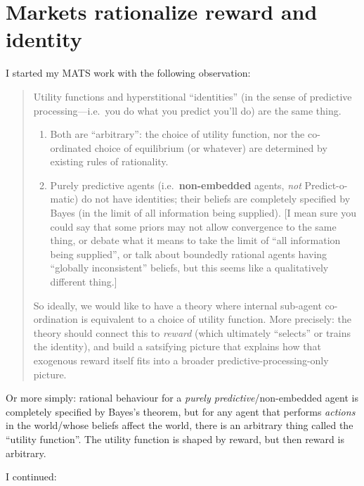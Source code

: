 \hypertarget{markets-rationalize-reward-and-identity}{%
\section{Markets rationalize reward and identity}\label{markets-rationalize-reward-and-identity}}

I started my MATS work with the following observation:

\begin{quote}
Utility functions and hyperstitional ``identities'' (in the sense of predictive processing---i.e.~you do what you predict you'll do) are the same thing.

\begin{enumerate}
\def\labelenumi{\arabic{enumi}.}
\tightlist
\item
  Both are ``arbitrary'': the choice of utility function, nor the co-ordinated choice of equilibrium (or whatever) are determined by existing rules of rationality.
\item
  Purely predictive agents (i.e.~\textbf{non-embedded} agents, \emph{not} Predict-o-matic) do not have identities; their beliefs are completely specified by Bayes (in the limit of all information being supplied). {[}I mean sure you could say that some priors may not allow convergence to the same thing, or debate what it means to take the limit of ``all information being supplied'', or talk about boundedly rational agents having ``globally inconsistent'' beliefs, but this seems like a qualitatively different thing.{]}
\end{enumerate}

So ideally, we would like to have a theory where internal sub-agent co-ordination is equivalent to a choice of utility function. More precisely: the theory should connect this to \emph{reward} (which ultimately ``selects'' or trains the identity), and build a satsifying picture that explains how that exogenous reward itself fits into a broader predictive-processing-only picture.
\end{quote}

Or more simply: rational behaviour for a \emph{purely predictive}/non-embedded agent is completely specified by Bayes's theorem, but for any agent that performs \emph{actions} in the world/whose beliefs affect the world, there is an arbitrary thing called the ``utility function''. The utility function is shaped by reward, but then reward is arbitrary.

I continued:

